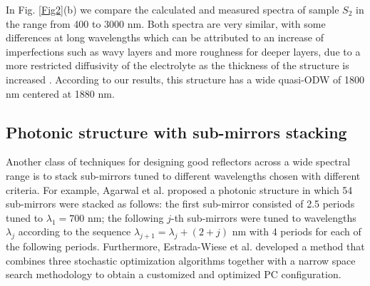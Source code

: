 \documentclass[a4paper,fleqn]{cas-sc}
\begin{document}
In Fig. \ref{Fig2}(b) we compare the
calculated and measured spectra of sample $S_2$ in the range
from 400 to 3000 nm.
Both spectra are very similar, with some differences at long
wavelengths which can be
attributed to an increase of imperfections such as wavy layers and
more roughness for deeper layers, due to a more restricted diffusivity
of the electrolyte as the thickness of the structure is increased
\cite{Negro2003,Vincent1993}. According to our results, this
structure has a wide quasi-ODW of 1800 nm
centered at 1880 nm.



\subsection{Photonic structure with sub-mirrors stacking}\label{ss:stacked}

Another class of techniques for designing good reflectors across a wide spectral range
is to stack sub-mirrors tuned to different wavelengths chosen with
different criteria.
For example, Agarwal et al. \cite{Agarwal2003} proposed a photonic
structure in which 54 sub-mirrors were stacked as follows: the
first sub-mirror consisted of 2.5 periods tuned to
$\lambda_{1}=700$ nm; the following $j$-th sub-mirrors were tuned to
wavelengths $\lambda_{j}$ according to the sequence $\lambda_{j+1}
= \lambda_{j}+ \left(2+j \right)$ nm
with 4 periods for
each of the following periods.
Furthermore, Estrada-Wiese et al. \cite{DelRio2018}
developed a method that combines three stochastic optimization algorithms together with
a  narrow space search methodology to obtain a customized and optimized
PC configuration.
\end{document}
